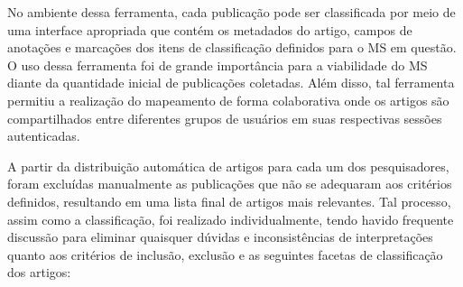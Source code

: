No ambiente dessa ferramenta, cada publicação pode ser classificada por meio de uma interface apropriada que contém os metadados do artigo, campos de anotações e marcações dos itens de classificação definidos para o MS em questão. O uso dessa ferramenta foi de grande importância para a viabilidade do MS diante da quantidade inicial de publicações coletadas. Al\'{e}m disso, tal ferramenta permitiu 
a realiza\c{c}\~{a}o do mapeamento de forma colaborativa onde os artigos s\~{a}o compartilhados entre diferentes grupos de usuários em suas respectivas sess\~{o}es autenticadas.

A partir da distribuição automática de artigos para cada um dos pesquisadores, foram excluídas manualmente as publicações que não se adequaram aos critérios definidos, resultando em uma lista final de \AcceptedPubs artigos mais relevantes. Tal processo, assim como a classificação, foi realizado individualmente, tendo havido frequente discussão para eliminar quaisquer dúvidas e inconsistências de interpretações quanto aos critérios de inclusão, exclusão e as seguintes 
facetas de classificação dos artigos:
